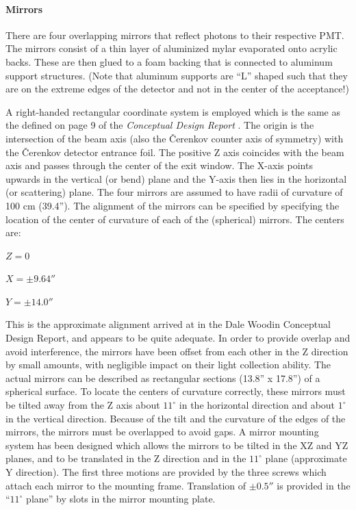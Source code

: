 \paragraph{Mirrors}

	There are four overlapping mirrors that reflect photons to their
respective PMT.  The mirrors consist of a thin layer of aluminized mylar
evaporated onto acrylic backs.  These are then glued to a foam backing
that is connected to aluminum support structures.  (Note that aluminum
supports are ``L'' shaped such that they are on the extreme edges of the
detector and not in the center of the acceptance!)

	A right-handed rectangular coordinate system is employed which
is the same as the defined on page 9 of the {\em Conceptual Design
Report} \cite{bi:Woodin} .  The origin is the intersection of the beam
axis (also the \v{C}erenkov counter axis of symmetry) with the
\v{C}erenkov detector entrance foil.  The positive Z axis coincides
with the beam axis and passes through the center of the exit window.
The X-axis points upwards in the vertical (or bend) plane and the
Y-axis then lies in the horizontal (or scattering) plane.  The four
mirrors are assumed to have radii of curvature of 100 cm (39.4'').
The alignment of the mirrors can be specified by specifying the
location of the center of curvature of each of the (spherical)
mirrors.  The centers are:


$Z=0$

$X=\pm9.64''$

$Y=\pm14.0''$


	This is the approximate alignment arrived at in the Dale
Woodin Conceptual Design Report, and appears to be quite adequate.  In
order to provide overlap and avoid interference, the mirrors have been
offset from each other in the Z direction by small amounts, with
negligible impact on their light collection ability.  The actual
mirrors can be described as rectangular sections (13.8'' x 17.8'') of
a spherical surface.  To locate the centers of curvature correctly,
these mirrors must be tilted away from the Z axis about $11^{\circ}$
in the horizontal direction and about $1^{\circ}$ in the vertical
direction.  Because of the tilt and the curvature of the edges of the
mirrors, the mirrors must be overlapped to avoid gaps.  A mirror
mounting system has been designed which allows the mirrors to be tilted
in the XZ and YZ planes, and to be translated in the Z direction and
in the $11^{\circ}$ plane (approximate Y direction).  The first three
motions are provided by the three screws which attach each mirror to
the mounting frame.  Translation of $\pm0.5''$ is provided in the
``$11^{\circ}$ plane'' by slots in the mirror mounting plate.

